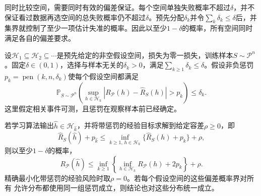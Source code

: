 同时比较空间，需要同时有效的偏差保证。每个空间单独失败概率不超过$\delta$，并不保证看过数据再选空间的总失败概率仍不超过$\delta$。预先分配$\delta_k$并令$\sum_k\delta_k\leq\delta$后，并集界就控制了至少一项估计失准的概率。因此以至少$1-\delta$的概率，所有空间同时满足各自的偏差要求。

\begin{theorem}[结构风险最小化的期望风险保证]
\label{thm:srm-oracle-bound}
设$\mathcal H_1\subseteq\mathcal H_2\subseteq\cdots$是预先给定的非空假设空间，损失为零一损失，训练样本$S\sim\mathcal P^n$。固定$\delta\in(0,1)$，选择与样本无关的$\delta_k>0$，满足$\sum_{k\geq1}\delta_k\leq\delta$。假设非负惩罚$p_k=\operatorname{pen}(k,n,\delta_k)$使每个假设空间都满足
\begin{equation}
 \mathbb P_{S\sim\mathcal P^n}\left(
 \sup_{h\in\mathcal H_k}
 |R_{\mathcal P}(h)-\hat R_S(h)|>p_k
 \right)\leq\delta_k.
 \label{eq:srm-classwise-confidence}
\end{equation}
这里假定相关事件可测，且惩罚在观察样本前已经确定。

若学习算法输出$\hat h\in\mathcal H_{\hat k}$，并将带惩罚的经验目标求解到给定容差$\rho\geq0$，即
\begin{equation}
 \hat R_S(\hat h)+p_{\hat k}
 \leq\inf_{k\geq1,\,h\in\mathcal H_k}
       \{\hat R_S(h)+p_k\}+\rho,
 \label{eq:srm-approximate-minimizer}
\end{equation}
则以至少$1-\delta$的概率，
\begin{equation}
 R_{\mathcal P}(\hat h)
 \leq\inf_{k\geq1}\left\{
       \inf_{h\in\mathcal H_k}R_{\mathcal P}(h)+2p_k
       \right\}+\rho.
 \label{eq:srm-oracle}
\end{equation}
精确最小化带惩罚的经验风险时取$\rho=0$。若每个假设空间的这些偏差概率界对所有
允许分布都使用同一组惩罚成立，则结论也对这些分布统一成立。
\end{theorem}


